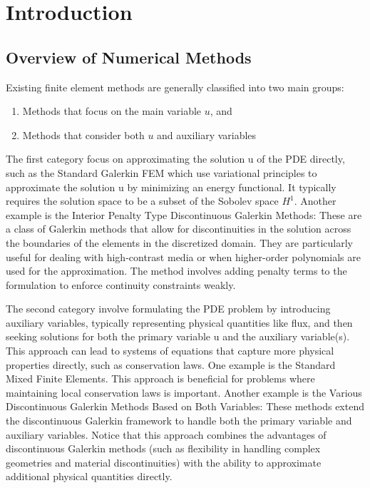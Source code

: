 \documentclass[12pt]{article} %
\begin{document}
\section{Introduction}
\subsection{Overview of Numerical Methods}
Existing finite element methods are generally classified into two main groups: 
\begin{enumerate}
    \item Methods that focus on the main variable \( u \), and 
    \item Methods that consider both \( u \) and auxiliary variables
\end{enumerate}
The first category focus on approximating the solution u of the PDE directly, such as the Standard Galerkin FEM \cite{Ciarlet1978} which 
use variational principles to approximate the solution u by minimizing an energy functional.
It typically requires the solution space to be a subset of the Sobolev space $H^1$. Another example is the Interior Penalty Type Discontinuous 
Galerkin Methods\cite{Riviere1999}: These are a class of Galerkin methods that allow 
for discontinuities in the solution across the boundaries of the elements in the discretized domain. 
They are particularly useful for dealing with high-contrast media or when higher-order polynomials 
are used for the approximation. The method involves adding penalty terms to the formulation to 
enforce continuity constraints weakly.

The second category involve formulating the PDE problem by introducing auxiliary variables, 
typically representing physical quantities like flux, and then seeking solutions for
both the primary variable u and the auxiliary variable(s). This approach can lead to 
systems of equations that capture more physical properties directly, such as conservation 
laws. One example is the Standard Mixed Finite Elements\cite{Raviart1977}. This approach 
is beneficial for problems where maintaining local conservation laws is important. Another example is the Various Discontinuous Galerkin Methods Based on Both Variables\cite{Jeon2010}: These methods extend 
the discontinuous Galerkin framework to handle both the primary variable and auxiliary 
variables. Notice that this approach combines the advantages of discontinuous Galerkin 
methods (such as flexibility in handling complex geometries and material discontinuities) 
with the ability to approximate additional physical quantities directly. 
\end{document}
